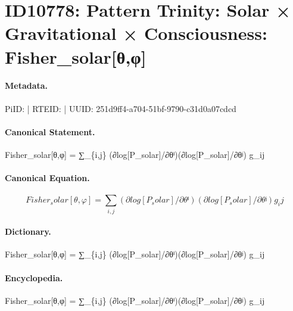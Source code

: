 \section*{ID10778: Pattern Trinity: Solar × Gravitational × Consciousness: Fisher\_solar[θ,φ]}
\paragraph{Metadata.}
PiID:  | RTEID:  | UUID: 251d9ff4-a704-51bf-9790-c31d0a07cdcd

\paragraph{Canonical Statement.}
Fisher\_solar[θ,φ] = ∑\_\{i,j\} (∂log[P\_solar]/∂θⁱ)(∂log[P\_solar]/∂θʲ) g\_ij

\paragraph{Canonical Equation.}
\[
Fisher_solar[θ,φ] = ∑_{i,j} (∂log[P_solar]/∂θⁱ)(∂log[P_solar]/∂θʲ) g_ij
\]

\paragraph{Dictionary.}
Fisher\_solar[θ,φ] = ∑\_\{i,j\} (∂log[P\_solar]/∂θⁱ)(∂log[P\_solar]/∂θʲ) g\_ij

\paragraph{Encyclopedia.}
Fisher\_solar[θ,φ] = ∑\_\{i,j\} (∂log[P\_solar]/∂θⁱ)(∂log[P\_solar]/∂θʲ) g\_ij
